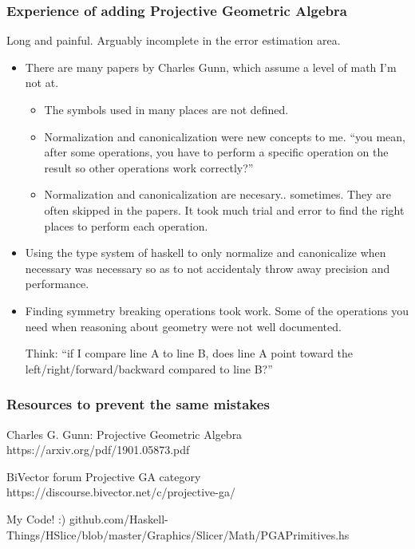 \documentclass[hyperref={pdfpagemode=FullScreen},aspectratio=169]{beamer}
\begin{document}
\begin{frame}
  \frametitle{Experience of adding Projective Geometric Algebra}
  Long and painful. Arguably incomplete in the error estimation area.
  \begin{itemize}
  \item There are many papers by Charles Gunn, which assume a level of math I'm not at.
    \begin{itemize}
    \item The symbols used in many places are not defined.
    \item Normalization and canonicalization were new concepts to me. ``you mean, after some operations, you have to perform a specific operation on the result so other operations work correctly?''
    \item Normalization and canonicalization are necesary.. sometimes. They are often skipped in the papers. It took much trial and error to find the right places to perform each operation.
    \end{itemize}
  \item Using the type system of haskell to only normalize and canonicalize when necessary was necessary so as to not accidentaly throw away precision and performance.
  \item Finding symmetry breaking operations took work. Some of the operations you need when reasoning about geometry were not well documented.\par
    Think: ``if I compare line A to line B, does line A point toward the left/right/forward/backward compared to line B?''
  \end{itemize}
\end{frame}

\begin{frame}
  \frametitle{Resources to prevent the same mistakes}
  \begin{block}{Charles G. Gunn: Projective Geometric Algebra}
    https://arxiv.org/pdf/1901.05873.pdf
  \end{block}
  \begin{block}{BiVector forum Projective GA category}
   https://discourse.bivector.net/c/projective-ga/
  \end{block}
  \begin{block}{My Code! :)}
    github.com/Haskell-Things/HSlice/blob/master/Graphics/Slicer/Math/PGAPrimitives.hs
  \end{block}
\end{frame}
\end{document}
